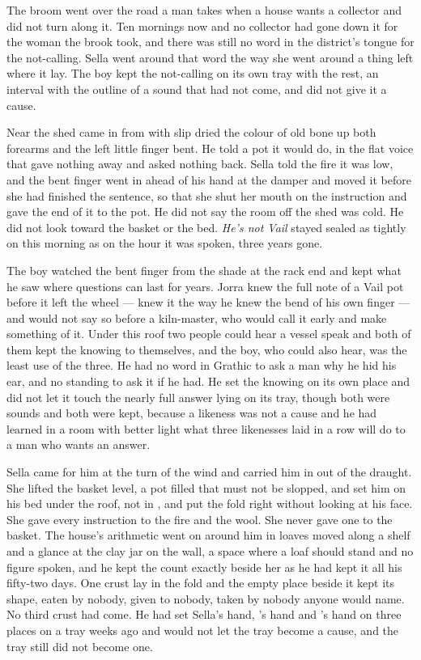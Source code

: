 The broom went over the road a man takes when a house wants a collector and did not turn along it. Ten mornings now and no collector had gone down it for the woman the brook took, and there was still no word in the district's tongue for the not-calling. Sella went around that word the way she went around a thing left where it lay. The boy kept the not-calling on its own tray with the rest, an interval with the outline of a sound that had not come, and did not give it a cause.

\scenebreak

Near the shed  came in from  with slip dried the colour of old bone up both forearms and the left little finger bent. He told a pot it would do, in the flat voice that gave nothing away and asked nothing back. Sella told the fire it was low, and the bent finger went in ahead of his hand at the damper and moved it before she had finished the sentence, so that she shut her mouth on the instruction and gave the end of it to the pot. He did not say the room off the shed was cold. He did not look toward the basket or the bed. \emph{He's not Vail} stayed sealed as tightly on this morning as on the hour it was spoken, three years gone.

The boy watched the bent finger from the shade at the rack end and kept what he saw where questions can last for years. Jorra knew the full note of a Vail pot before it left the wheel --- knew it the way he knew the bend of his own finger --- and would not say so before a kiln-master, who would call it early and make something of it. Under this roof two people could hear a vessel speak and both of them kept the knowing to themselves, and the boy, who could also hear, was the least use of the three. He had no word in Grathic to ask a man why he hid his ear, and no standing to ask it if he had. He set the knowing on its own place and did not let it touch the nearly full answer lying on its tray, though both were sounds and both were kept, because a likeness was not a cause and he had learned in a room with better light what three likenesses laid in a row will do to a man who wants an answer.

\scenebreak

Sella came for him at the turn of the wind and carried him in out of the draught. She lifted the basket level, a pot filled that must not be slopped, and set him on his bed under the  roof, not in , and put the fold right without looking at his face. She gave every instruction to the fire and the wool. She never gave one to the basket. The house's arithmetic went on around him in loaves moved along a shelf and a glance at the clay jar on the wall, a space where a loaf should stand and no figure spoken, and he kept the count exactly beside her as he had kept it all his fifty-two days. One crust lay in the fold and the empty place beside it kept its shape, eaten by nobody, given to nobody, taken by nobody anyone would name. No third crust had come. He had set Sella's hand, 's hand and 's hand on three places on a tray weeks ago and would not let the tray become a cause, and the tray still did not become one.

